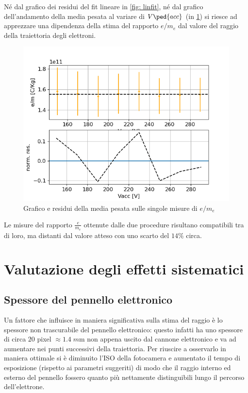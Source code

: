 \documentclass[10pt, a4paper, italian]{article}
\begin{document}
Né dal grafico dei residui del fit lineare in \cref{fig: linfit}, né dal
grafico dell'andamento della media pesata al variare di $V\ped{acc}$ (in
\cref{fig: medpes}) si riesce ad apprezzare una dipendenza della stima del
rapporto $e/m_e$ dal valore del raggio della traiettoria degli elettroni.

\begin{figure}
\includegraphics[width=\textwidth]{medpes}
\caption{Grafico e residui della media pesata sulle singole misure di $e/m_e$
\label{fig: medpes}}
\end{figure}

Le misure del rapporto $\frac{e}{m_e}$ ottenute dalle due procedure risultano
compatibili tra di loro, ma distanti dal valore atteso con uno scarto del
$14 \percent$ circa. 

\section{Valutazione degli effetti sistematici}
\subsection{Spessore del pennello elettronico}
Un fattore che influisce in maniera significativa sulla stima del raggio è
lo spessore non trascurabile del pennello elettronico: questo infatti ha uno
spessore di circa $20$ pixel $\approx 1.4 \; \si{m\m}$ non appena uscito dal
cannone elettronico e va ad aumentare nei punti successivi della traiettoria. 
Per riuscire a osservarlo in maniera ottimale si è diminuito l'ISO della
fotocamera e aumentato il tempo di esposizione (rispetto ai parametri
suggeriti) di modo che il raggio interno ed esterno del pennello fossero
quanto più nettamente distinguibili lungo il percorso dell'elettrone.
\end{document}
